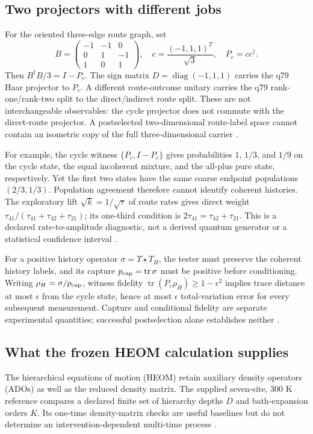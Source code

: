 \documentclass[11pt]{article}
\theoremstyle{definition}
\theoremstyle{remark}
\begin{document}
\subsection{Two projectors with different jobs}\label{sec:route-witness}
For the oriented three-edge route graph, set
\[
B=\begin{pmatrix}-1&-1&0\\0&1&-1\\1&0&1\end{pmatrix},\quad
c=\frac{(-1,1,1)^T}{\sqrt3},\quad P_c=cc^\dagger.
\]
Then \(B^\dagger B/3=I-P_c\). The sign matrix
\(D=\operatorname{diag}(-1,1,1)\) carries the q79 Haar projector to \(P_c\).
A different route-outcome unitary carries the q79 rank-one/rank-two split
to the direct/indirect route split. These are not interchangeable
observables: the cycle projector does not commute with the direct-route
projector. A postselected two-dimensional route-label space cannot contain
an isometric copy of the full three-dimensional carrier \cite{beq02}.

For example, the cycle witness \(\{P_c,I-P_c\}\) gives probabilities
\(1\), \(1/3\), and \(1/9\) on the cycle state, the equal incoherent mixture,
and the all-plus pure state, respectively. Yet the first two states have
the same coarse endpoint populations \((2/3,1/3)\). Population agreement
therefore cannot identify coherent histories. The exploratory lift
\(\sqrt{k}=1/\sqrt{\tau}\) of route rates gives direct weight
\(\tau_{41}/(\tau_{41}+\tau_{42}+\tau_{21})\); its one-third condition is
\(2\tau_{41}=\tau_{42}+\tau_{21}\). This is a declared rate-to-amplitude
diagnostic, not a derived quantum generator or a statistical confidence
interval \cite{beq02,beq03}.

For a positive history operator \(\sigma=\Upsilon\star T_H\), the tester
must preserve the coherent history labels, and its capture
\(p_{\rm cap}=\operatorname{tr}\sigma\) must be positive before conditioning.
Writing \(\rho_H=\sigma/p_{\rm cap}\), witness fidelity
\(\operatorname{tr}(P_c\rho_H)\geq1-\epsilon^2\) implies trace distance at
most \(\epsilon\) from the cycle state, hence at most \(\epsilon\)
total-variation error for every subsequent measurement. Capture and
conditional fidelity are separate experimental quantities; successful
postselection alone establishes neither \cite{beq03}.

\subsection{What the frozen HEOM calculation supplies}\label{sec:heom-history}
The hierarchical equations of motion (HEOM) retain auxiliary density
operators (ADOs) as well as the reduced density matrix. The supplied
seven-site, 300 K reference compares a declared finite set of hierarchy
depths \(D\) and bath-expansion orders \(K\). Its one-time density-matrix
checks are useful baselines but do not determine an intervention-dependent
multi-time process \cite{beq04}.
\end{document}
